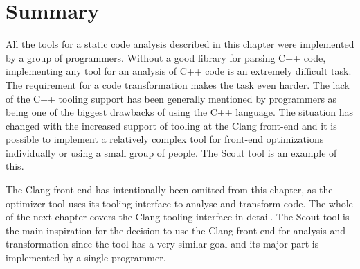 \section{Summary}
All the tools for a static code analysis described in this chapter were implemented by a group of programmers. Without a good library for parsing C++ code,  implementing any tool for an analysis of C++ code is an extremely difficult task. The requirement for a code transformation makes the task even harder. The lack of the C++ tooling support has been generally mentioned by programmers as being one of the biggest drawbacks of using the C++ language. The situation has changed with the increased support of tooling at the Clang front-end and it is possible to implement a relatively complex tool for front-end optimizations individually or using a small group of people. The Scout tool is an example of this.

The Clang front-end has intentionally been omitted from this chapter, as the optimizer tool uses its tooling interface to analyse and transform code. The whole of the next chapter covers the Clang tooling interface in detail. The Scout tool is the main inspiration for the decision to use the Clang front-end for analysis and transformation since the tool has a very similar goal and its major part is implemented by a single programmer.